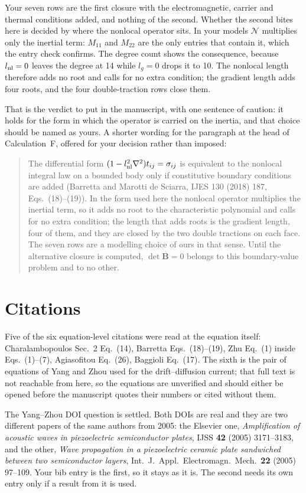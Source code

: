 \documentclass[11pt,a4paper]{article}
\begin{document}
Your seven rows are the first closure with the electromagnetic, carrier and thermal conditions
added, and nothing of the second. Whether the second bites here is decided by where the nonlocal
operator sits. In your models $\mathcal{N}$ multiplies only the inertial term: $M_{11}$ and $M_{22}$ are
the only entries that contain it, which the entry check confirms. The degree count shows the
consequence, because $l_{\rm nl}=0$ leaves the degree at 14 while $l_g=0$ drops it to 10. The
nonlocal length therefore adds no root and calls for no extra condition; the gradient length adds
four roots, and the four double-traction rows close them.

That is the verdict to put in the manuscript, with one sentence of caution: it holds for the form
in which the operator is carried on the inertia, and that choice should be named as yours. A
shorter wording for the paragraph at the head of Calculation~F, offered for your decision rather
than imposed:
\begin{quote}\small
The differential form $(1-l_{\rm nl}^2\nabla^2)t_{ij}=\sigma_{ij}$ is equivalent to the nonlocal
integral law on a bounded body only if constitutive boundary conditions are added (Barretta and
Marotti de Sciarra, IJES 130 (2018) 187, Eqs.~(18)--(19)). In the form used here the nonlocal
operator multiplies the inertial term, so it adds no root to the characteristic polynomial and
calls for no extra condition; the length that adds roots is the gradient length, four of them, and
they are closed by the two double tractions on each face. The seven rows are a modelling choice of
ours in that sense. Until the alternative closure is computed, $\det\mathbf B=0$ belongs to this
boundary-value problem and to no other.
\end{quote}

\section*{Citations}

Five of the six equation-level citations were read at the equation itself: Charalambopoulos
Sec.~2 Eq.~(14), Barretta Eqs.~(18)--(19), Zhu Eq.~(1) inside Eqs.~(1)--(7), Agiasofitou
Eq.~(26), Baggioli Eq.~(17). The sixth is the pair of equations of Yang and Zhou used for the
drift--diffusion current; that full text is not reachable from here, so the equations are
unverified and should either be opened before the manuscript quotes their numbers or cited without
them.

The Yang--Zhou DOI question is settled. Both DOIs are real and they are two different papers of the
same authors from 2005: the Elsevier one, \emph{Amplification of acoustic waves in piezoelectric
semiconductor plates}, IJSS \textbf{42} (2005) 3171--3183, and the other, \emph{Wave propagation in
a piezoelectric ceramic plate sandwiched between two semiconductor layers}, Int.\ J.\ Appl.\
Electromagn.\ Mech.\ \textbf{22} (2005) 97--109. Your bib entry is the first, so it stays as it is.
The second needs its own entry only if a result from it is used.
\end{document}

